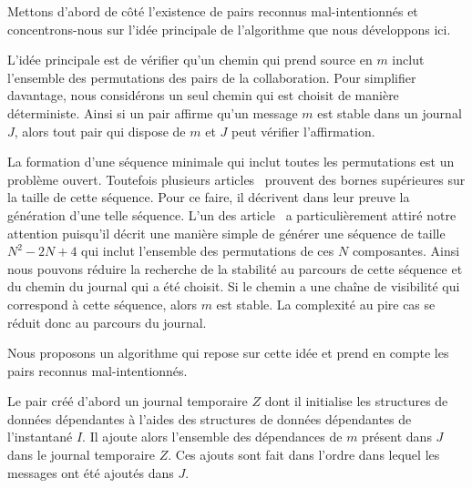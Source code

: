 Mettons d'abord de côté l'existence de pairs reconnus mal-intentionnés et concentrons-nous sur l'idée principale de l'algorithme que nous développons ici.



L'idée principale est de vérifier qu'un chemin qui prend source en $m$ inclut l'ensemble des permutations des pairs de la collaboration.
Pour simplifier davantage, nous considérons un seul chemin qui est choisit de manière déterministe.
Ainsi si un pair affirme qu'un message $m$ est stable dans un journal $J$, alors tout pair qui dispose de $m$ et $J$ peut vérifier l'affirmation.

La formation d'une séquence minimale qui inclut toutes les permutations est un problème ouvert.
Toutefois plusieurs articles~\autocite{engen2018_containing} prouvent des bornes supérieures sur la taille de cette séquence.
Pour ce faire, il décrivent dans leur preuve la génération d'une telle séquence.
L'un des article~\autocite{adleman_1974_shortperm} a particulièrement attiré notre attention puisqu'il décrit une manière simple de générer une séquence de taille $N^2 -2N +4$ qui inclut l'ensemble des permutations de ces $N$ composantes.
Ainsi nous pouvons réduire la recherche de la stabilité au parcours de cette séquence et du chemin du journal qui a été choisit.
Si le chemin a une chaîne de visibilité qui correspond à cette séquence, alors $m$ est stable.
La complexité au pire cas se réduit donc au parcours du journal.

Nous proposons un algorithme qui repose sur cette idée et prend en compte les pairs reconnus mal-intentionnés.

Le pair créé d'abord un journal temporaire $Z$ dont il initialise les structures de données dépendantes à l'aides des structures de données dépendantes de l'instantané $I$.
Il ajoute alors l'ensemble des dépendances de $m$ présent dans $J$ dans le journal temporaire $Z$.
Ces ajouts sont fait dans l'ordre dans lequel les messages ont été ajoutés dans $J$.

